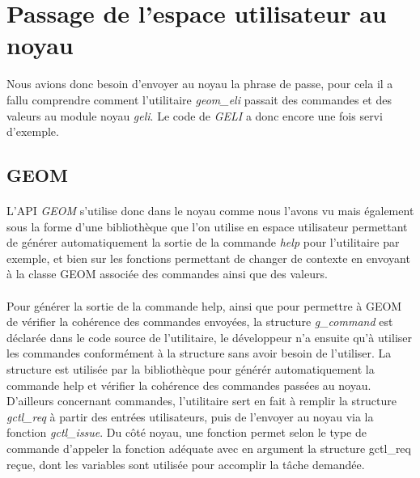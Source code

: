 \section{Passage de l'espace utilisateur au noyau}
Nous avions donc besoin d'envoyer au noyau la phrase de passe, pour cela il a
fallu comprendre comment l'utilitaire {\em geom\_eli} passait des commandes et
des valeurs au module noyau {\em geli}. Le code de {\em GELI} a donc encore une
fois servi d'exemple.

\subsection{GEOM}
\paragraph{}
L'API {\em GEOM} s'utilise donc dans le noyau comme nous l'avons vu mais
également sous la forme d'une bibliothèque que l'on utilise en espace
utilisateur permettant de générer automatiquement la sortie de la commande 
{\em help} pour l'utilitaire par exemple, et bien sur les fonctions permettant
de changer de contexte en envoyant à la classe GEOM associée des commandes ainsi
que des valeurs.

\paragraph{}
Pour générer la sortie de la commande help, ainsi que pour permettre à GEOM de
vérifier la cohérence des commandes envoyées, la structure {\em g\_command} est
déclarée dans le code source de l'utilitaire, le développeur n'a ensuite qu'à 
utiliser les commandes conformément à la structure sans avoir besoin de
l'utiliser. La structure est utilisée par la bibliothèque pour générér
automatiquement la commande help et vérifier la cohérence des commandes passées
au noyau. D'ailleurs concernant commandes,
l'utilitaire sert en fait à remplir la structure {\em gctl\_req} à partir des
entrées utilisateurs, puis de l'envoyer au noyau via la fonction
{\em gctl\_issue}. Du côté noyau, une fonction permet selon le type de commande
d'appeler la fonction adéquate avec en argument la structure gctl\_req reçue,
dont les variables sont utilisée pour accomplir la tâche demandée.



